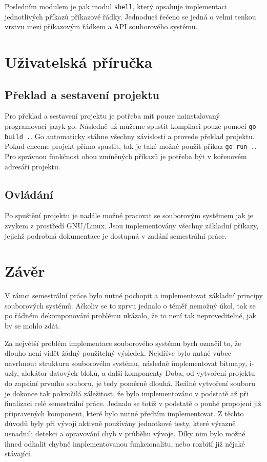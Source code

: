 \documentclass[12pt, a4paper]{article}
\begin{document}
    Posledním modulem je pak modul \texttt{shell}, který opsahuje implementaci jednotlivých příkazů příkazové řádky.
    Jednodueš řečeno se jedná o velmi tenkou vrstvu mezi příkazovým řádkem a API souborového systému.

    \section{Uživatelská příručka}
    \subsection{Překlad a sestavení projektu}
    Pro překlad a sestavení projektu je potřeba mít pouze nainstalovaný programovací jazyk go.
    Následně už můžeme spustit kompilaci pouze pomocí \texttt{go build .}.
    Go automaticky stáhne všechny závislosti a provede překlad projektu.
    Pokud chceme projekt přímo spustit, tak je také možné použít příkaz \texttt{go run .}.
    Pro správnou funkčnost obou zmíněných příkazů je potřeba být v kořenovém adresáři projektu.

    \subsection{Ovládání}
    Po spuštění projektu je nadále možné pracovat se souborovým systémem jak je zvykem z prostředí GNU/Linux.
    Jsou implementovány všechny základní příkazy, jejichž podrobná dokumentace je dostupná v zadání semestrální práce.

    \section{Závěr}
    V rámci semestrální práce bylo nutné pochopit a implementovat základní principy souborových systémů.
    Ačkoliv se to zprvu jednalo o téměř nemožný úkol, tak se po řádném dekomponování problému ukázalo, že to není tak neproveditelné, jak by se mohlo zdát.

    Za největší problém implementace souborového systému bych označil to, že dlouho není vidět žádný použitelný výsledek.
    Nejdříve bylo nutné vůbec navrhnout strukturu souborového systému, následně implementovat bitmapy, i-uzly, alokátor datových bloků, a další komponenty
    Doba, od vytvoření projektu do zapsání prvního souboru, je tedy poměrně dlouhá.
    Reálné vytvoření souboru je dokonce tak pokročilá záležitost, že bylo implementováno v podstatě až při finalizaci celé semestrální práce.
    Jednalo se totiž v podstatě o pouhé propojení již připravených komponent, které bylo nutné předtím implementovat.
    Z těchto důvodů byly při vývoji aktivně používány jednotkové testy, které výrazně usnadnili detekci a opravování chyb v průběhu vývoje.
    Díky nim bylo možné ihned odhalit chybně implementovanou funkcionalitu, nebo rozbití již nějaké stávající.
\end{document}
